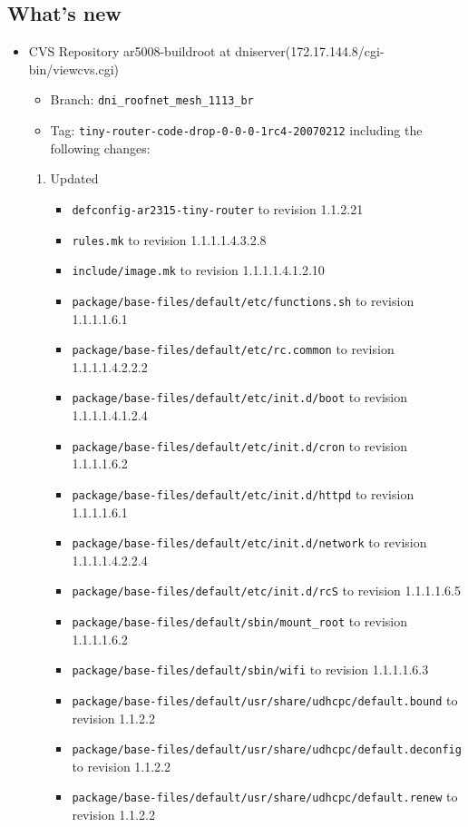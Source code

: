 \documentclass[12pt]{report}
\begin{document}
\subsection{What's new}
\begin{itemize}
\item CVS Repository ar5008-buildroot at dniserver(172.17.144.8/cgi-bin/viewcvs.cgi) 
\begin{itemize}
    \item Branch: \texttt{dni\_roofnet\_mesh\_1113\_br}
    \item Tag: \texttt{tiny-router-code-drop-0-0-0-1rc4-20070212} including the following changes:
\end{itemize}
\begin{enumerate}
\item Updated
\begin{itemize}
	\item \texttt{defconfig-ar2315-tiny-router} to revision 1.1.2.21
	\item \texttt{rules.mk} to revision 1.1.1.1.4.3.2.8
	\item \texttt{include/image.mk} to revision 1.1.1.1.4.1.2.10
	\item \texttt{package/base-files/default/etc/functions.sh} to revision 1.1.1.1.6.1
	\item \texttt{package/base-files/default/etc/rc.common} to revision 1.1.1.1.4.2.2.2
	\item \texttt{package/base-files/default/etc/init.d/boot} to revision 1.1.1.1.4.1.2.4
	\item \texttt{package/base-files/default/etc/init.d/cron} to revision 1.1.1.1.6.2
	\item \texttt{package/base-files/default/etc/init.d/httpd} to revision 1.1.1.1.6.1
	\item \texttt{package/base-files/default/etc/init.d/network} to revision 1.1.1.1.4.2.2.4
	\item \texttt{package/base-files/default/etc/init.d/rcS} to revision 1.1.1.1.6.5
	\item \texttt{package/base-files/default/sbin/mount\_root} to revision 1.1.1.1.6.2
	\item \texttt{package/base-files/default/sbin/wifi} to revision 1.1.1.1.6.3
	\item \texttt{package/base-files/default/usr/share/udhcpc/default.bound} to revision 1.1.2.2
	\item \texttt{package/base-files/default/usr/share/udhcpc/default.deconfig} to revision 1.1.2.2
	\item \texttt{package/base-files/default/usr/share/udhcpc/default.renew} to revision 1.1.2.2

\end{itemize}
\end{enumerate}
\end{itemize}
\end{document}
